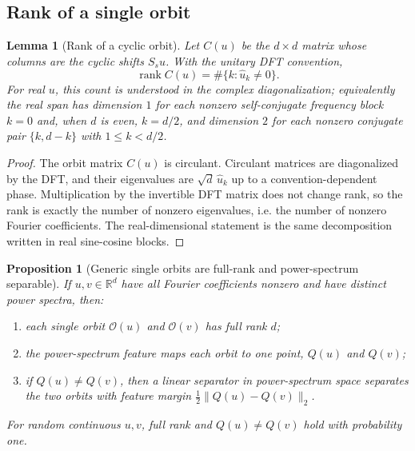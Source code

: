 \documentclass[11pt]{article}
\theoremstyle{plain}
\newtheorem{lemma}{Lemma}
\newtheorem{proposition}{Proposition}
\theoremstyle{definition}
\theoremstyle{remark}
\newcommand{\R}{\mathbb{R}}
\newcommand{\Orb}{\mathcal O}
\begin{document}
\subsection{Rank of a single orbit}\label{sec:rank}

\begin{lemma}[Rank of a cyclic orbit]\label{lem:orbit-rank}
Let $C(u)$ be the $d\times d$ matrix whose columns are the cyclic shifts $S_su$.  With the unitary DFT convention,
\[
\operatorname{rank} C(u)=\#\{k:\hat u_k\ne0\}.
\]
For real $u$, this count is understood in the complex diagonalization; equivalently the real span has dimension $1$ for each nonzero self-conjugate frequency block $k=0$ and, when $d$ is even, $k=d/2$, and dimension $2$ for each nonzero conjugate pair $\{k,d-k\}$ with $1\le k<d/2$.
\end{lemma}

\begin{proof}
The orbit matrix $C(u)$ is circulant.  Circulant matrices are diagonalized by the DFT, and their eigenvalues are $\sqrt d\,\hat u_k$ up to a convention-dependent phase.  Multiplication by the invertible DFT matrix does not change rank, so the rank is exactly the number of nonzero eigenvalues, i.e. the number of nonzero Fourier coefficients.  The real-dimensional statement is the same decomposition written in real sine-cosine blocks.
\end{proof}

\begin{proposition}[Generic single orbits are full-rank and power-spectrum separable]\label{prop:single-orbit-correction}
If $u,v\in\R^d$ have all Fourier coefficients nonzero and have distinct power spectra, then:
\begin{enumerate}[leftmargin=1.4em]
\item each single orbit $\Orb(u)$ and $\Orb(v)$ has full rank $d$;
\item the power-spectrum feature maps each orbit to one point, $Q(u)$ and $Q(v)$;
\item if $Q(u)\ne Q(v)$, then a linear separator in power-spectrum space separates the two orbits with feature margin $\frac12\|Q(u)-Q(v)\|_2$.
\end{enumerate}
For random continuous $u,v$, full rank and $Q(u)\ne Q(v)$ hold with probability one.
\end{proposition}
\end{document}
